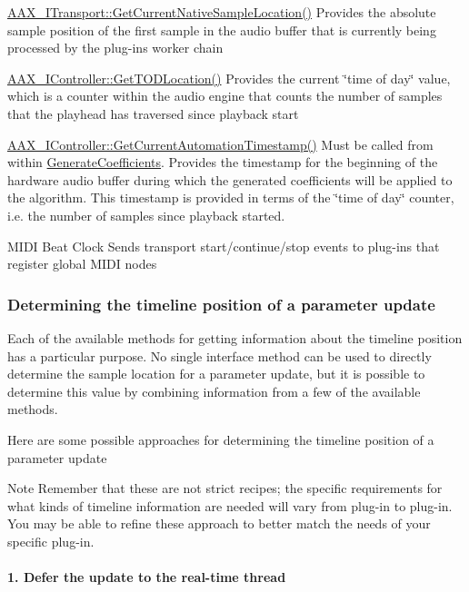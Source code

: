 \begin{DoxyItemize}
\item \hyperlink{a00116_a8119233b03774528ffaa519771d792a0}{A\+A\+X\+\_\+\+I\+Transport\+::\+Get\+Current\+Native\+Sample\+Location()}  Provides the absolute sample position of the first sample in the audio buffer that is currently being processed by the plug-\/in\textquotesingle{}s worker chain   
\item \hyperlink{a00090_afbc2973d755b6c3ae82b6c8461e9fdee}{A\+A\+X\+\_\+\+I\+Controller\+::\+Get\+T\+O\+D\+Location()}  Provides the current \char`\"{}time of day\char`\"{} value, which is a counter within the audio engine that counts the number of samples that the playhead has traversed since playback start   
\item \hyperlink{a00090_af9ab9b228023e116f89249a56c27a20f}{A\+A\+X\+\_\+\+I\+Controller\+::\+Get\+Current\+Automation\+Timestamp()}  Must be called from within \hyperlink{a00061_a083265b008921b6114ede387711694b7}{Generate\+Coefficients}. Provides the timestamp for the beginning of the hardware audio buffer during which the generated coefficients will be applied to the algorithm. This timestamp is provided in terms of the \char`\"{}time of day\char`\"{} counter, i.\+e. the number of samples since playback started.   
\item M\+I\+D\+I Beat Clock  Sends transport start/continue/stop events to plug-\/ins that register global M\+I\+D\+I nodes   
\end{DoxyItemize}\hypertarget{a00351_parameterUpdateTiming_determiningTimelinePosition}{}\subsubsection{Determining the timeline position of a parameter update}\label{a00351_parameterUpdateTiming_determiningTimelinePosition}
Each of the available methods for getting information about the timeline position has a particular purpose. No single interface method can be used to directly determine the sample location for a parameter update, but it is possible to determine this value by combining information from a few of the available methods.

Here are some possible approaches for determining the timeline position of a parameter update

\begin{DoxyNote}{Note}
Remember that these are not strict recipes; the specific requirements for what kinds of timeline information are needed will vary from plug-\/in to plug-\/in. You may be able to refine these approach to better match the needs of your specific plug-\/in.
\end{DoxyNote}
\hypertarget{a00351_parameterUpdateTiming_determiningTimelinePosition_1}{}\paragraph{1. Defer the update to the real-\/time thread}\label{a00351_parameterUpdateTiming_determiningTimelinePosition_1}

